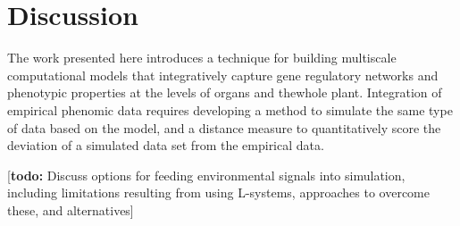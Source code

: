 \documentclass{frontiersSCNS} %
\newcommand{\todo}[1]{
  \rule{0pt}{0pt}\marginpar{{\color{blue}\rule{1ex}{1ex}}}
  {[\textbf{\color{blue}todo:} #1]}}
\begin{document}
\section{Discussion}

The work presented here introduces a technique for building multiscale
computational models that integratively capture gene regulatory
networks and phenotypic properties at the levels of organs and
thewhole plant. Integration of empirical phenomic data requires
developing a method to simulate the same type of data based on the
model, and a distance measure to quantitatively score the deviation of
a simulated data set from the empirical data.

\todo{Discuss options for feeding environmental signals into
  simulation, including limitations resulting from using L-systems,
  approaches to overcome these, and alternatives}






\end{document}
